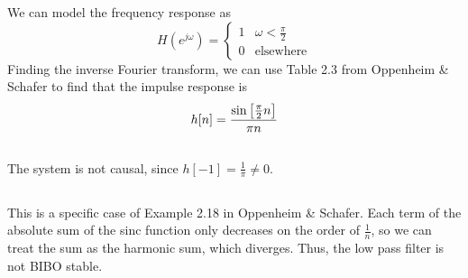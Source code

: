 \documentclass{article}
\begin{document}
\newpage
\section{}

\subsection{}

We can model the frequency response as
\begin{equation}
    H(e^{j \omega}) =
    \begin{cases}
        1 & \omega < \frac{\pi}{2} \\
        0 & \text{elsewhere}
    \end{cases}
\end{equation}
Finding the inverse Fourier transform, we can use Table 2.3 from Oppenheim \& Schafer to find that the impulse response is
\begin{equation}
    h[n] = \frac{\sine\left[\frac{\pi}{2} n\right]}{\pi n}
\end{equation}

\subsection{}

The system is not causal, since \(h[-1] = \frac{1}{\pi} \neq 0\).

\subsection{}

This is a specific case of Example 2.18 in Oppenheim \& Schafer.
Each term of the absolute sum of the sinc function only decreases on the order of \(\frac{1}{n}\), so we can treat the sum as the harmonic sum, which diverges.
Thus, the low pass filter is not BIBO stable.
\end{document}
